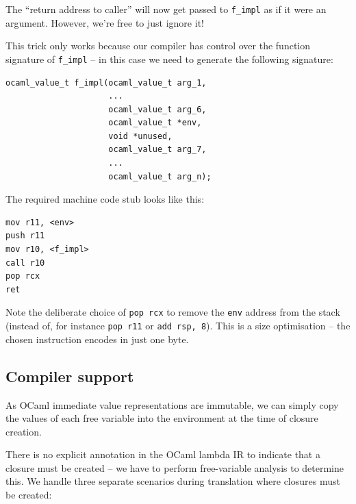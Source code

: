 \documentclass[12pt,a4paper,twoside,openright]{report}
\begin{document}
The ``return address to caller'' will now get passed to \lstinline!f_impl! as if
it were an argument. However, we're free to just ignore it!

This trick only works because our compiler has control over the function signature
of \lstinline{f_impl} -- in this case we need to generate the following signature:

\begin{lstlisting}
ocaml_value_t f_impl(ocaml_value_t arg_1,
                     ...
                     ocaml_value_t arg_6,
                     ocaml_value_t *env,
                     void *unused,
                     ocaml_value_t arg_7,
                     ...
                     ocaml_value_t arg_n);
\end{lstlisting}

The required machine code stub looks like this:

\begin{lstlisting}
mov r11, <env>
push r11
mov r10, <f_impl>
call r10
pop rcx
ret
\end{lstlisting}

Note the deliberate choice of \lstinline{pop rcx} to remove the
\lstinline{env} address from the stack (instead of, for instance
\lstinline{pop r11} or \lstinline{add rsp, 8}). This is a size optimisation --
the chosen instruction encodes in just one byte.

\subsection{Compiler support}\label{closures-compiler-support}

As OCaml immediate value representations are immutable, we can simply copy the
values of each free variable into the environment at the time of closure
creation.

There is no explicit annotation in the OCaml lambda IR to indicate that a
closure must be created -- we have to perform free-variable analysis
to determine this. We handle three separate scenarios during translation where
closures must be created:
\end{document}
